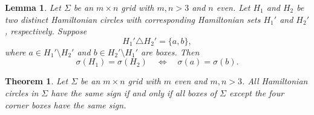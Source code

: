 \documentclass[10pt,a4paper]{amsart}
\newtheorem{lemma}{Lemma}
\newtheorem{theorem}{Theorem}
\begin{document}
\begin{lemma}\label{lemma123} 
Let $\Sigma$ be an $m\times n$ grid with $m,n>3$ and $n$ even.
Let $H_1$ and $H_2$ be two distinct Hamiltonian circles with corresponding Hamiltonian sets
$H_1'$ and $H_2'$, respectively. Suppose
\[
H_1' \triangle H_2'=\{a,b\},
\]
where $a\in H_1'\setminus H_2'$ and $b\in H_2'\setminus H_1'$ are boxes. Then
\[
\sigma(H_1)=\sigma(H_2)\quad \Longleftrightarrow\quad \sigma(a)=\sigma(b).
\]
\end{lemma}

\begin{theorem}\label{thm:all-same-sign}
Let $\Sigma$ be an $m\times n$ grid with $m$ even and $m,n>3$.
 All Hamiltonian circles in $\Sigma$ have the same sign if and only if all boxes of $\Sigma$ except the four corner boxes have the same sign.
\end{theorem}
\end{document}
